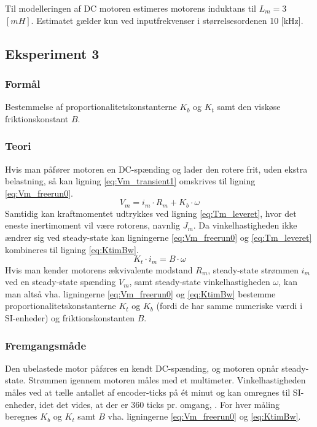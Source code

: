 Til modelleringen af DC motoren estimeres motorens induktans til \(L_m=3\) \([mH]\).
Estimatet gælder kun ved inputfrekvenser i størrelsesordenen 10 [kHz].

\subsection{Eksperiment 3}
\label{ss:eksperiment3}
\subsubsection{Formål}
Bestemmelse af proportionalitetskonstanterne \(K_b\) og \(K_t\) samt den viskøse friktionskonstant \(B\).

\subsubsection{Teori}
Hvis man påfører motoren en DC-spænding og lader den rotere frit, uden ekstra belastning,
så kan ligning \ref{eq:Vm_transient1} omskrives til ligning \ref{eq:Vm_freerun0}.
\begin{equation}
	V_m=i_m\cdot{R_m}+K_b\cdot\omega
	\label{eq:Vm_freerun0}
 \end{equation}
Samtidig kan kraftmomentet udtrykkes ved ligning \ref{eq:Tm_leveret}, hvor det eneste inertimoment vil være
rotorens, navnlig \(J_m\).
Da vinkelhastigheden ikke ændrer sig ved steady-state kan ligningerne \ref{eq:Vm_freerun0} og \ref{eq:Tm_leveret} kombineres
til ligning \ref{eq:KtimBw}.
\begin{equation}
	K_t\cdot{i_m}=B\cdot\omega
	\label{eq:KtimBw}
 \end{equation}
Hvis man kender motorens ækvivalente modstand \(R_m\), steady-state strømmen \(i_m\) ved en steady-state spænding \(V_m\),
samt steady-state vinkelhastigheden \(\omega\), kan man altså vha. ligningerne \ref{eq:Vm_freerun0} og \ref{eq:KtimBw} bestemme
proportionalitetskonstanterne \(K_t\) og \(K_b\) (fordi de har samme numeriske værdi i SI-enheder) og friktionskonstanten \(B\).
\subsubsection{Fremgangsmåde}
Den ubelastede motor påføres en kendt DC-spænding, og motoren opnår steady-state.
Strømmen igennem motoren måles med et multimeter.
Vinkelhastigheden måles ved at tælle antallet af encoder-ticks på ét minut og kan omregnes til SI-enheder, 
idet det vides, at der er 360 ticks pr. omgang, \citep{emgmotor}.
For hver måling beregnes \(K_b\) og \(K_t\) samt \(B\) vha. ligningerne \ref{eq:Vm_freerun0} og \ref{eq:KtimBw}.

